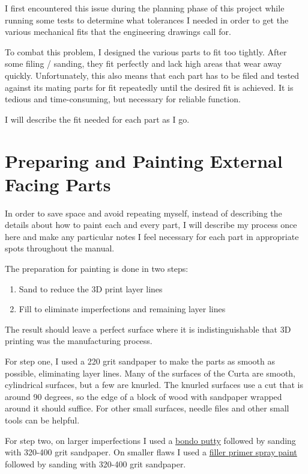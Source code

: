 \documentclass[openany]{book}
\begin{document}
I first encountered this issue during the planning phase of this project while running some tests to determine what tolerances I needed in order to get the various mechanical fits that the engineering drawings call for.

To combat this problem, I designed the various parts to fit too tightly. After some filing / sanding, they fit perfectly and lack high areas that wear away quickly. Unfortunately, this also means that each part has to be filed and tested against its mating parts for fit repeatedly until the desired fit is achieved. It is tedious and time-consuming, but necessary for reliable function.

I will describe the fit needed for each part as I go.


\section{Preparing and Painting External Facing Parts}
In order to save space and avoid repeating myself, instead of describing the details about how to paint each and every part, I will describe my process once here and make any particular notes I feel necessary for each part in appropriate spots throughout the manual.

The preparation for painting is done in two steps:
\begin{enumerate}
\item Sand to reduce the 3D print layer lines
\item Fill to eliminate imperfections and remaining layer lines
\end{enumerate}
The result should leave a perfect surface where it is indistinguishable that 3D printing was the manufacturing process.

For step one, I used a 220 grit sandpaper to make the parts as smooth as possible, eliminating layer lines. Many of the surfaces of the Curta are smooth, cylindrical surfaces, but a few are knurled. The knurled surfaces use a cut that is around 90 degrees, so the edge of a block of wood with sandpaper wrapped around it should suffice. For other small surfaces, needle files and other small tools can be helpful.

For step two, on larger imperfections I used a \href{http://amzn.to/2nBwh0R}{bondo putty} followed by sanding with 320-400 grit sandpaper. On smaller flaws I used a \href{http://amzn.to/2nwQNPs}{filler primer spray paint} followed by sanding with 320-400 grit sandpaper.
\end{document}

